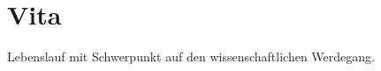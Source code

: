 
\chapter*{Vita}
{}%

\begingroup
	\let\clearpage\relax
	\let\cleardoublepage\relax

	Lebenslauf mit Schwerpunkt auf den wissenschaftlichen Werdegang.

\endgroup